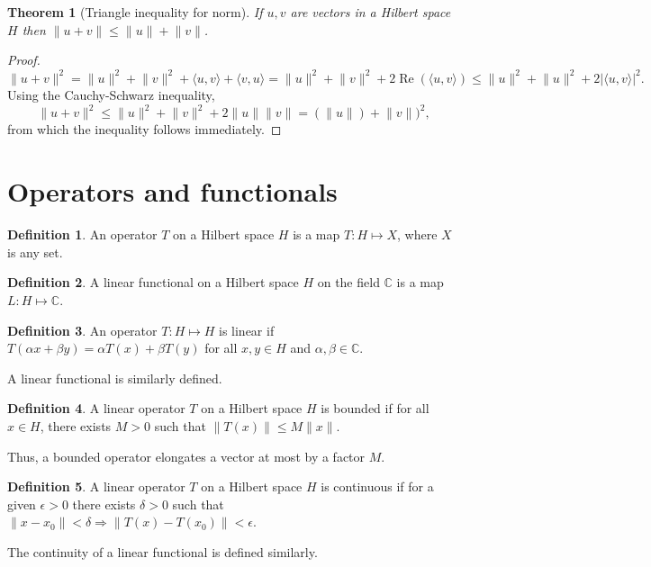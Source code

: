 \documentclass{article}
\theoremstyle{plain}
\newtheorem{thm}{Theorem}
\numberwithin{thm}{section}
\theoremstyle{plain}
\numberwithin{prop}{section}
\theoremstyle{definition}
\newtheorem{defn}{Definition}
\numberwithin{defn}{section}
\theoremstyle{remark}
\numberwithin{equation}{section}
\DeclareMathOperator{\re}{Re}
\begin{document}
\begin{thm}[Triangle inequality for norm]\label{s3t6}
If $u, v$ are vectors in a Hilbert space $H$ then $\lVert u + v\rVert \le 
\lVert u \rVert + \lVert v \rVert$.
\end{thm}
\begin{proof}
$\lVert u + v\rVert^2 = \lVert u \rVert^2 + \lVert v \rVert^2 + 
\langle u, v\rangle + \langle v, u\rangle = \lVert u \rVert^2 + 
\lVert v \rVert^2 + 2\re(\langle u, v\rangle) \le \lVert u \rVert^2 +
\lVert u \rVert^2 + 2|\langle u, v\rangle|^2.$ Using the Cauchy-Schwarz
inequality,
\[
\lVert u + v\rVert^2 \le \lVert u \rVert^2 +\lVert v \rVert^2 + 2\lVert u\rVert
\lVert v \rVert = (\lVert u \rVert) + \lVert v \rVert)^2,
\]
from which the inequality follows immediately.
\end{proof}

\section{Operators and functionals}\label{s4}
\begin{defn}\label{s4d1}
An operator $T$ on a Hilbert space $H$ is a map $T: H \mapsto X$, where $X$ is
any set.
\end{defn}

\begin{defn}\label{s4d2}
A linear functional on a Hilbert space $H$ on the field $\mathbb{C}$ is a map
$L: H \mapsto \mathbb{C}$.
\end{defn}

\begin{defn}\label{s4d3}
An operator $T: H \mapsto H$ is linear if $T(\alpha x + \beta y) = \alpha T(x)
+ \beta T(y)$ for all $x, y \in H$ and $\alpha, \beta \in \mathbb{C}$.
\end{defn}
A linear functional is similarly defined.

\begin{defn}\label{s4d4}
A linear operator $T$ on a Hilbert space $H$ is bounded if for all $x \in H$,
there exists $M > 0$ such that $\lVert T(x)\rVert \le M\lVert x \rVert$.
\end{defn}
Thus, a bounded operator elongates a vector at most by a factor $M$.

\begin{defn}\label{s4d5}
A linear operator $T$ on a Hilbert space $H$ is continuous if for a given
$\epsilon > 0$ there exists $\delta > 0$ such that $\lVert x - x_0\rVert <
\delta \Rightarrow \lVert T(x) - T(x_0)\rVert < \epsilon$.
\end{defn}
The continuity of a linear functional is defined similarly.
\end{document}
